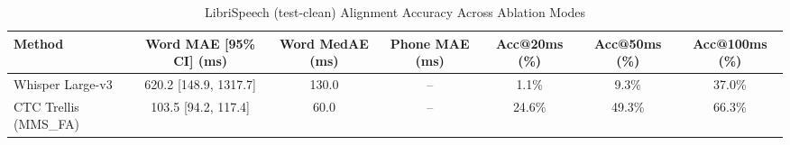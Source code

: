 \begin{table}[t]
\centering
\caption{LibriSpeech (test-clean) Alignment Accuracy Across Ablation Modes}
\label{tab:alignment_accuracy}
\begin{tabular}{lcccccc}
\toprule
Method & Word MAE [95\% CI] (ms) & Word MedAE (ms) & Phone MAE (ms) & Acc@20ms (\%) & Acc@50ms (\%) & Acc@100ms (\%) \\
\midrule
Whisper Large-v3 & 620.2 [148.9, 1317.7] & 130.0 & -- & 1.1\% & 9.3\% & 37.0\% \\
CTC Trellis (MMS\_FA) & 103.5 [94.2, 117.4] & 60.0 & -- & 24.6\% & 49.3\% & 66.3\% \\
\bottomrule
\end{tabular}
\end{table}
